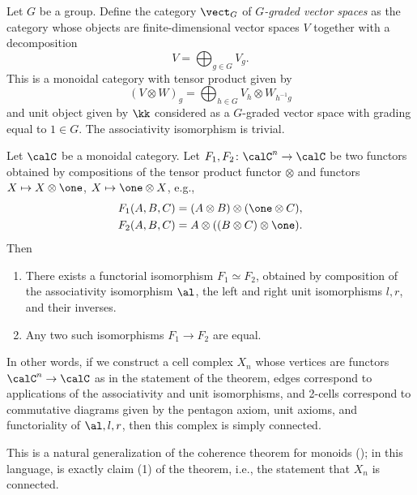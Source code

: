 \begin{example}\label{x:vecg}
  Let $G$ be a group. Define the category $\vect_G$ of \emph{$G$-graded vector
  spaces} as the category
  whose objects are finite-dimensional vector spaces $V$ together with
  a decomposition
  $$
    V=\bigoplus_{g\in G} V_g.
  $$
  This is a monoidal category with tensor product given by
  $$
    (V\otimes W)_g = \bigoplus_{h\in G} V_h \otimes W_{h^{-1}g}
  $$
  and unit object given by $\kk$ considered as a $G$-graded vector space with
  grading equal to $1\in G$. The associativity isomorphism is trivial.
\end{example}



\begin{theorem}\label{t:maclane}\par

  \noindent Let $\calC$ be a monoidal category. Let
  $F_1, F_2\colon \calC^n\to \calC$ be two functors obtained by compositions of
  the tensor product functor $\otimes$ and functors $X\mapsto X\otimes \one$,
  $X\mapsto \one \otimes X$, e.g.,
  \begin{align*}
    F_1(A,B,C)&=(A\otimes B)\otimes (\one\otimes C),\\
    F_2(A,B,C)&=A\otimes (( B\otimes  C)\otimes \one).
  \end{align*}
  Then
  \begin{enumerate}
    \item There exists a functorial isomorphism $F_1\simeq F_2$, obtained
      by composition of the associativity isomorphism $\al$, the left and right
      unit isomorphisms $l,r$, and their inverses.
    \item Any two such isomorphisms $F_1\to F_2$ are equal.
  \end{enumerate}
\end{theorem}
In other words, if we construct a cell complex $X_n$ whose vertices are functors
$\calC^n\to \calC$ as in the statement of the theorem, edges correspond to
applications of the associativity and unit isomorphisms, and 2-cells correspond
to commutative diagrams given by the pentagon axiom, unit axioms, and
functoriality of $\al, l, r$, then this complex is simply connected.

This is a natural generalization of the coherence theorem for monoids
(); in this language, 
is exactly claim (1) of the theorem, i.e., the statement that $X_n$
is connected.

